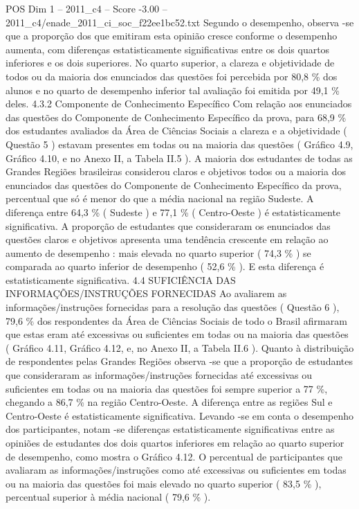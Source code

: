 \begin{textsample}{POS Dim 1 – 2011\_c4 – Score -3.00 – 2011\_c4/enade\_2011\_ci\_soc\_f22ee1bc52.txt}
Segundo o desempenho, observa -se que a proporção dos que emitiram esta opinião cresce conforme o desempenho aumenta, com diferenças estatisticamente significativas entre os dois quartos inferiores e os dois superiores.
No quarto superior, a clareza e objetividade de todos ou da maioria dos enunciados das questões foi percebida por 80,8 \% dos alunos e no quarto de desempenho inferior tal avaliação foi emitida por 49,1 \% deles. 4.3.2 Componente de Conhecimento Específico Com relação aos enunciados das questões do Componente de Conhecimento Específico da prova, para 68,9 \% dos estudantes avaliados da Área de Ciências Sociais a clareza e a objetividade ( Questão 5 ) estavam presentes em todas ou na maioria das questões ( Gráfico 4.9, Gráfico 4.10, e no Anexo II, a Tabela II.5 ).
A maioria dos estudantes de todas as Grandes Regiões brasileiras considerou claros e objetivos todos ou a maioria dos enunciados das questões do Componente de Conhecimento Específico da prova, percentual que só é menor do que a média nacional na região Sudeste.
A diferença entre 64,3 \% ( Sudeste ) e 77,1 \% ( Centro-Oeste ) é estatisticamente significativa.
A proporção de estudantes que consideraram os enunciados das questões claros e objetivos apresenta uma tendência crescente em relação ao aumento de desempenho : mais elevada no quarto superior ( 74,3 \% ) se comparada ao quarto inferior de desempenho ( 52,6 \% ).
E esta diferença é estatisticamente significativa. 4.4 SUFICIÊNCIA DAS INFORMAÇÕES/INSTRUÇÕES FORNECIDAS Ao avaliarem as informações/instruções fornecidas para a resolução das questões ( Questão 6 ), 79,6 \% dos respondentes da Área de Ciências Sociais de todo o Brasil afirmaram que estas eram até excessivas ou suficientes em todas ou na maioria das questões ( Gráfico 4.11, Gráfico 4.12, e, no Anexo II, a Tabela II.6 ).
Quanto à distribuição de respondentes pelas Grandes Regiões observa -se que a proporção de estudantes que consideraram as informações/instruções fornecidas até excessivas ou suficientes em todas ou na maioria das questões foi sempre superior a 77 \%, chegando a 86,7 \% na região Centro-Oeste.
A diferença entre as regiões Sul e Centro-Oeste é estatisticamente significativa.
Levando -se em conta o desempenho dos participantes, notam -se diferenças estatisticamente significativas entre as opiniões de estudantes dos dois quartos inferiores em relação ao quarto superior de desempenho, como mostra o Gráfico 4.12.
O percentual de participantes que avaliaram as informações/instruções como até excessivas ou suficientes em todas ou na maioria das questões foi mais elevado no quarto superior ( 83,5 \% ), percentual superior à média nacional ( 79,6 \% ).

\end{textsample}
